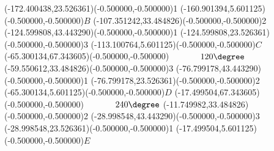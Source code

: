 \ASYalign(-172.400438,23.526361)(-0.500000,-0.500000){1}%
\color{ASYcolor}
\fontsize{12.000000}{14.400000}\selectfont
\ASYalign(-160.901394,5.601125)(-0.500000,-0.500000){$B$}%
\color{ASYcolor}
\fontsize{12.000000}{14.400000}\selectfont
\ASYalign(-107.351242,33.484826)(-0.500000,-0.500000){2}%
\color{ASYcolor}
\fontsize{12.000000}{14.400000}\selectfont
\ASYalign(-124.599808,43.443290)(-0.500000,-0.500000){1}%
\color{ASYcolor}
\fontsize{12.000000}{14.400000}\selectfont
\ASYalign(-124.599808,23.526361)(-0.500000,-0.500000){3}%
\color{ASYcolor}
\fontsize{12.000000}{14.400000}\selectfont
\ASYalign(-113.100764,5.601125)(-0.500000,-0.500000){$C$}%
\color{ASYcolor}
\fontsize{12.000000}{14.400000}\selectfont
\ASYalign(-65.300134,67.343605)(-0.500000,-0.500000){$\phantom{\degree}120\degree$}%
\color{ASYcolor}
\fontsize{12.000000}{14.400000}\selectfont
\ASYalign(-59.550612,33.484826)(-0.500000,-0.500000){3}%
\color{ASYcolor}
\fontsize{12.000000}{14.400000}\selectfont
\ASYalign(-76.799178,43.443290)(-0.500000,-0.500000){1}%
\color{ASYcolor}
\fontsize{12.000000}{14.400000}\selectfont
\ASYalign(-76.799178,23.526361)(-0.500000,-0.500000){2}%
\color{ASYcolor}
\fontsize{12.000000}{14.400000}\selectfont
\ASYalign(-65.300134,5.601125)(-0.500000,-0.500000){$D$}%
\color{ASYcolor}
\fontsize{12.000000}{14.400000}\selectfont
\ASYalign(-17.499504,67.343605)(-0.500000,-0.500000){$\phantom{\degree}240\degree$}%
\color{ASYcolor}
\fontsize{12.000000}{14.400000}\selectfont
\ASYalign(-11.749982,33.484826)(-0.500000,-0.500000){2}%
\color{ASYcolor}
\fontsize{12.000000}{14.400000}\selectfont
\ASYalign(-28.998548,43.443290)(-0.500000,-0.500000){3}%
\color{ASYcolor}
\fontsize{12.000000}{14.400000}\selectfont
\ASYalign(-28.998548,23.526361)(-0.500000,-0.500000){1}%
\color{ASYcolor}
\fontsize{12.000000}{14.400000}\selectfont
\ASYalign(-17.499504,5.601125)(-0.500000,-0.500000){$E$}%
